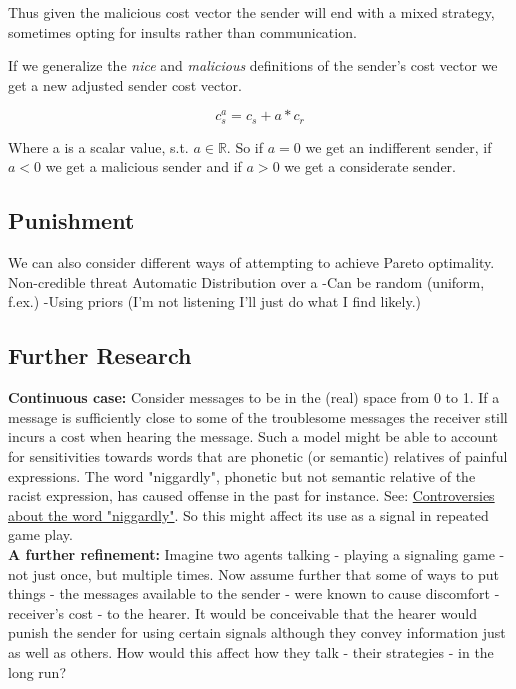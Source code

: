 \documentclass[10]{article}
\begin{document}
Thus given the malicious cost vector the sender will end with a mixed strategy, sometimes opting for insults rather than communication.

If we generalize the \textit{nice} and \textit{malicious} definitions of the sender's cost vector we get a new adjusted sender cost vector.

\begin{equation*}
c_s^a= c_s + a * c_r
\end{equation*}

Where a is a scalar value, s.t. $a \in \mathbb{R} $. So if $a=0$ we get an indifferent sender, if$a <0$ we get a malicious sender and if $a>0$ we get a considerate sender.

\subsection{Punishment}
We can also consider different ways of attempting to achieve Pareto optimality.
Non-credible threat
Automatic
Distribution over a
-Can be random (uniform, f.ex.)
-Using priors (I'm not listening I'll just do what I find likely.)

\subsection{Further Research}

\textbf{Continuous case:} Consider messages to be in the (real) space from 0 to 1. If a message is sufficiently close to some of the troublesome messages the receiver still incurs a cost when hearing the message.
Such a model might be able to account for sensitivities towards words that are phonetic (or semantic) relatives of painful expressions. The word "niggardly", phonetic but not semantic relative of the racist expression, has caused offense in the past for instance. See: \href{https://en.wikipedia.org/wiki/Controversies_about_the_word_\%22niggardly\%22}{Controversies about the word "niggardly"}. So this might affect its use as a signal in repeated game play.\\ 

\textbf{A further refinement:}
Imagine two agents talking - playing a signaling game - not just once, but multiple times. Now assume further that some of ways to put things - the messages available to the sender - were known to cause discomfort - receiver's cost - to the hearer. It would be conceivable that the hearer would punish the sender for using certain signals although they convey information just as well as others. How would this affect how they talk - their strategies - in the long run?\\ 
\end{document}
